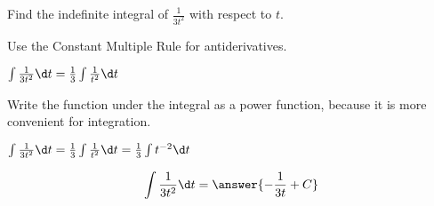 \documentclass{ximera}
\author{Gregory Hartman \and Matthew Carr\and Nela Lakos}
\begin{document}
\begin{exercise}


Find the indefinite integral of $\frac{1}{3t^2}$ with respect to $t$.
\begin{hint}
Use the Constant Multiple Rule for antiderivatives.

$\int\frac{1}{3t^2}\d t=\frac{1}{3}\int\frac{1}{t^2}\d t$
 \end{hint}
\begin{hint}
Write the  function under the integral as a power function, because it is more convenient for integration.

$\int\frac{1}{3t^2}\d t=\frac{1}{3}\int\frac{1}{t^2}\d t=\frac{1}{3}\int t^{-2}\d t$
\end{hint}
\[
\int \frac{1}{3t^2}\d t=\answer{-\frac{1}{3t}+C}
\]


\end{exercise}
\end{document}
